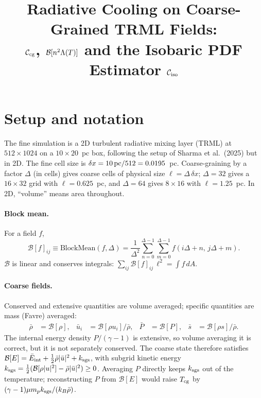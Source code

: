 \documentclass[11pt]{article}
\title{Radiative Cooling on Coarse-Grained TRML Fields:\\
$\mathcal{C}_{\rm cg}$, $\B[n^2\Lambda(T)]$ and the Isobaric PDF Estimator $\mathcal{C}_{\rm iso}$}
\date{}
\newcommand{\B}{\mathcal{B}}
\newcommand{\Tcg}{T_{\rm cg}}
\begin{document}
\maketitle

\section{Setup and notation}

The fine simulation is a 2D turbulent radiative mixing layer (TRML) at $512\times1024$ on a $10\times20$~pc box, following the setup of Sharma et al.\ (2025) but in 2D. The fine cell size is $\delta x = 10\,{\rm pc}/512 = 0.0195$~pc. Coarse-graining by a factor $\Delta$ (in cells) gives coarse cells of physical size $\ell=\Delta\,\delta x$; $\Delta=32$ gives a $16\times32$ grid with $\ell=0.625$~pc, and $\Delta=64$ gives $8\times16$ with $\ell=1.25$~pc. In 2D, ``volume'' means area throughout.

\paragraph{Block mean.} For a field $f$,
\begin{equation}
\B[f]_{ij} \equiv \mathrm{BlockMean}(f,\Delta) = \frac{1}{\Delta^2}\sum_{n=0}^{\Delta-1}\sum_{m=0}^{\Delta-1} f(i\Delta+n,\,j\Delta+m).
\end{equation}
$\B$ is linear and conserves integrals: $\sum_{ij}\B[f]_{ij}\,\ell^2=\int f\,dA$.

\paragraph{Coarse fields.} Conserved and extensive quantities are volume averaged; specific quantities are mass (Favre) averaged:
\begin{align}
\bar\rho &= \B[\rho], &
\bar u_i &= \B[\rho u_i]/\bar\rho, &
\bar P &= \B[P], &
\bar s &= \B[\rho s]/\bar\rho .
\end{align}
The internal energy density $P/(\gamma-1)$ is extensive, so volume averaging it is correct, but it is not separately conserved. The coarse state therefore satisfies $\B[E]=\bar E_{\rm int}+\tfrac12\bar\rho|\bar u|^2+k_{\rm sgs}$, with subgrid kinetic energy $k_{\rm sgs}=\tfrac12(\B[\rho|u|^2]-\bar\rho|\bar u|^2)\ge0$. Averaging $P$ directly keeps $k_{\rm sgs}$ out of the temperature; reconstructing $P$ from $\B[E]$ would raise $\Tcg$ by $(\gamma-1)\mu m_p k_{\rm sgs}/(k_B\bar\rho)$.
\end{document}
